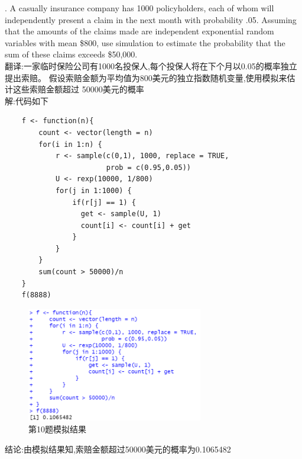 \documentclass{book}
\begin{document}
. A casually insurance company has 1000 policyholders, each of whom will independently
present a claim in the next month with probability .05. Assuming that the amounts of
the claims made are independent exponential random variables with mean \$800, use
simulation to estimate the probability that the sum of these claims exceeds \$50,000. \\
翻译:一家临时保险公司有1000名投保人,每个投保人将在下个月以0.05的概率独立提出索赔。
假设索赔金额为平均值为800美元的独立指数随机变量,使用模拟来估计这些索赔金额超过
50000美元的概率  \\
解:代码如下
\lstset{language = R}
\begin{lstlisting}
    f <- function(n){
        count <- vector(length = n)
        for(i in 1:n) {
            r <- sample(c(0,1), 1000, replace = TRUE,
                        prob = c(0.95,0.05))
            U <- rexp(10000, 1/800)
            for(j in 1:1000) {
                if(r[j] == 1) {
                  get <- sample(U, 1)
                  count[i] <- count[i] + get
                }
            }
        }
        sum(count > 50000)/n
    }
    f(8888)
\end{lstlisting}
\begin{figure}[H]
  \centering
  \includegraphics*[height = 5cm, width = 7.7cm]{gramFile/第十题/10题运行截图.PNG}
  \caption{第10题模拟结果}
\end{figure}
结论:由模拟结果知,索赔金额超过50000美元的概率为0.1065482

\hspace*{\fill} \\
\end{document}
